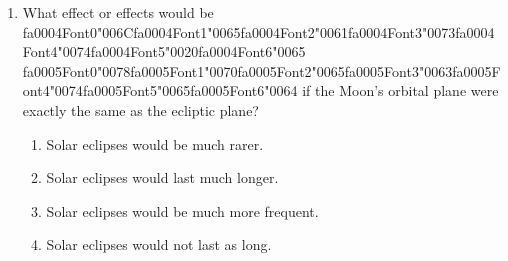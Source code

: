 \documentclass[12pt]{article}
\begin{document}
\begin{enumerate}[label=\arabic*.]
\begin{enumerate}[label=(\alph*)]
    \item Asteroids emit pulsed radiation
    \item Asteroids emit a lot of their own radiation
    \item They reflect enough of the sun's light to make them brighter than most background stars
    \item Asteroids have substantial motion relative to the background stars
\end{enumerate}
\item What effect or effects would be {\csname fa0004Font0\endcsname\char"006C}{\csname fa0004Font1\endcsname\char"0065}{\csname fa0004Font2\endcsname\char"0061}{\csname fa0004Font3\endcsname\char"0073}{\csname fa0004Font4\endcsname\char"0074}{\csname fa0004Font5\endcsname\char"0020}{\csname fa0004Font6\endcsname\char"0065} {\csname fa0005Font0\endcsname\char"0078}{\csname fa0005Font1\endcsname\char"0070}{\csname fa0005Font2\endcsname\char"0065}{\csname fa0005Font3\endcsname\char"0063}{\csname fa0005Font4\endcsname\char"0074}{\csname fa0005Font5\endcsname\char"0065}{\csname fa0005Font6\endcsname\char"0064} if the Moon's orbital plane were exactly
the same as the ecliptic plane?
\begin{enumerate}[label=(\alph*)]
    \item Solar eclipses would be much rarer.
    \item Solar eclipses would last much longer.
    \item Solar eclipses would be much more frequent.
    \item Solar eclipses would not last as long.
\end{enumerate}
\end{enumerate}
\end{document}
